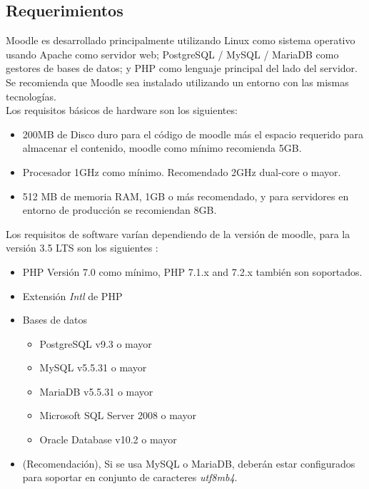 
\begin{quote}

\end{quote}

\subsection{Requerimientos}

Moodle es desarrollado principalmente utilizando Linux como sistema operativo usando Apache como servidor web; PostgreSQL / MySQL / MariaDB como gestores de bases de datos; y PHP como lenguaje principal del lado del servidor. Se recomienda que Moodle sea instalado utilizando un entorno con las mismas tecnologías. \cite{moodleInstall} \\

\noindent Los requisitos básicos de hardware son los siguientes:

    \begin{itemize}
        \item 200MB de Disco duro para el código de moodle más el espacio requerido para almacenar el contenido, moodle como mínimo recomienda 5GB.
        \item Procesador 1GHz como mínimo. Recomendado 2GHz dual-core o mayor.
        \item 512 MB de memoria RAM, 1GB o más recomendado, y para servidores en entorno de producción se recomiendan 8GB.
    \end{itemize}
\clearpage    
\noindent Los requisitos de software varían dependiendo de la versión de moodle, para la versión 3.5 LTS son los siguientes \cite{moodleReleaseNotes}:
    
    \begin{itemize}
        \item PHP Versión 7.0 como mínimo, PHP 7.1.x and 7.2.x también son soportados.
        \item Extensión {\it Intl} de PHP
        \item Bases de datos
            \begin{itemize}
                \item PostgreSQL v9.3 o mayor
                \item MySQL v5.5.31 o mayor
                \item MariaDB v5.5.31 o mayor
                \item Microsoft SQL Server 2008 o mayor
                \item Oracle Database v10.2 o mayor
            \end{itemize}
        \item[] (Recomendación), Si se usa MySQL o MariaDB, deberán estar configurados para soportar en conjunto de caracteres {\it utf8mb4}.
    \end{itemize}